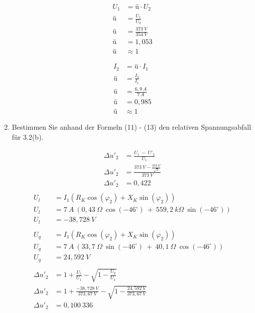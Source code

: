 \begin{enumerate}[label=\alph*)]
	      \begin{minipage}[r]{0.5\linewidth}
		      \begin{align*}
			      U_1 & = ü\cdot U_2            \\
			      ü   & = \frac{U_1}{U_2}       \\
			      ü   & = \frac{373\ V}{354\ V} \\
			      ü   & = 1,053                 \\
			      ü   & \approx 1
		      \end{align*}
	      \end{minipage}
	      \begin{minipage}[l]{0.5\linewidth}
		      \begin{align*}
			      I_2 & = ü\cdot I_1          \\
			      ü   & = \frac{I_2}{I_1}     \\
			      ü   & = \frac{6,9\ A}{7\ A} \\
			      ü   & = 0,985               \\
			      ü   & \approx 1
		      \end{align*}
	      \end{minipage}

	\item Bestimmen Sie anhand der Formeln (11) - (13) den relativen Spannungsabfall für
	      3.2(b).

	      \begin{align*}
		      \Delta u'_2 & = \frac{U_1\ -\ U'_2}{U_1}                       \\
		      \Delta u'_2 & = \frac{373\ V -\frac{373\ V}{\sqrt{3}}}{373\ V} \\
		      \Delta u'_2 & = 0,422                                          \\
	      \end{align*}
	      \begin{align*}
		      U_l         & = I_1(R_K\cos(\varphi_2)+X_K\sin(\varphi_2))                              \\
		      U_l         & = 7\ A\ (0,43\ \Omega\ \cos(-46^\circ)\ +\ 559,2 \ k\Omega\ \sin(-46^\circ)) \\
		      U_l         & = -38,728\ V                                                              \\
		      \\
		      U_q         & = I_1(R_K\cos(\varphi_2)+X_K\sin(\varphi_2))                              \\
		      U_q         & = 7\ A\ (33,7\ \Omega\ \sin(-46^\circ)\ +\ 40,1\ \Omega\ \cos(-46^\circ)) \\
		      U_q         & = 24,592\ V                                                               \\
		      \\
		      \Delta u'_2 & = 1+\frac{U_l}{U_1} - \sqrt{1-\frac{U_q}{U_1}}                            \\
		      \Delta u'_2 & = 1+\frac{-38,728\ V}{373,67\ V} - \sqrt{1-\frac{24,592\ V}{373,67\ V}}   \\
		      \Delta u'_2 & = 0,100\ 336
	      \end{align*}


\end{enumerate}
